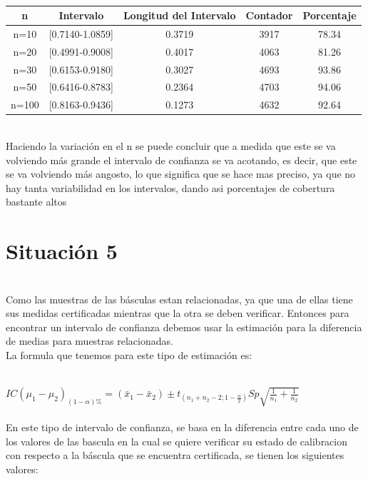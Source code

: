 \documentclass[letterpaper,12pt,onecolumn,titlepage]{article}
\begin{document}
~\\ \begin{center}
 \begin{tabular}{|c|c|c|c|c|}
\hline 
\rule[-1ex]{0pt}{2.5ex} n & Intervalo & Longitud del Intervalo & Contador & Porcentaje \\ 
\hline 
\rule[-1ex]{0pt}{2.5ex} n=10 & [0.7140-1.0859] & 0.3719 & 3917 & 78.34 \\ 
\hline 
\rule[-1ex]{0pt}{2.5ex} n=20 & [0.4991-0.9008] & 0.4017 & 4063 & 81.26 \\ 
\hline 
\rule[-1ex]{0pt}{2.5ex} n=30 & [0.6153-0.9180] & 0.3027 & 4693 & 93.86 \\ 
\hline 
\rule[-1ex]{0pt}{2.5ex} n=50 & [0.6416-0.8783] & 0.2364 & 4703 & 94.06 \\ 
\hline 
\rule[-1ex]{0pt}{2.5ex} n=100 & [0.8163-0.9436] & 0.1273 & 4632 & 92.64 \\ 
\hline 

\end{tabular} 
\end{center}


~\\ Haciendo la variaci\'{o}n en el n se puede concluir que a medida que este se va volviendo m\'{a}s grande el intervalo de confianza se va acotando, es decir, que este se va volviendo m\'{a}s angosto, lo que significa que se hace mas preciso, ya que no hay tanta variabilidad en los intervalos, dando asi porcentajes de cobertura bastante altos



\pagebreak\section{Situaci\'{o}n 5}
~\\ Como las muestras de las b\'{a}sculas estan relacionadas, ya que una de ellas tiene sus medidas certificadas mientras que la otra se deben verificar. Entonces para encontrar un intervalo de confianza   debemos usar la estimaci\'{o}n para la diferencia de medias para muestras relacionadas.
~\\ La formula que tenemos para este tipo de estimaci\'{o}n es:

~\\ $IC(\mu_{1}-\mu_{2} )_{(1-\alpha)\%}=(\bar{x}_{1} - \bar{x}_{2}) \pm t_{(n_{1}+ n_{2} -2 ; 1-\frac{\alpha}{2})}S{p}\sqrt{\frac{1}{n_1}+\frac{1}{n_2}}$ \\


~\\ En este tipo de intervalo de confianza,  se basa en la diferencia entre cada uno de los valores de las bascula en la cual se quiere verificar su estado de calibracion con respecto a la b\'{a}scula que se encuentra certificada, se tienen los siguientes valores:
 
\end{document}
